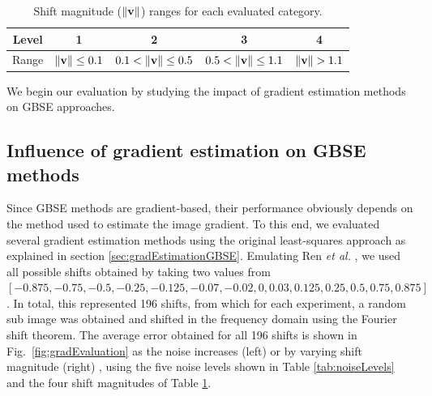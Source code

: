 \begin{table}[htpb]
\centering
\begin{tabular}{|c|c|c|c|c|} 
	\hline
	Level & 1 & 2 & 3 & 4 \\ \hline
	Range & $\left\lVert\mathbf{v}\right\rVert \leq 0.1$ & $0.1 < \left\lVert\mathbf{v}\right\rVert \leq 0.5$ & $0.5 < \left\lVert\mathbf{v}\right\rVert \leq 1.1$ & $\left\lVert\mathbf{v}\right\rVert > 1.1$ \\ \hline
\end{tabular}
\caption{Shift magnitude ($\left\lVert\mathbf{v}\right\rVert$) ranges for each evaluated category.}
\label{tab:shiftMagnitudeCategories}
\end{table}


We begin our evaluation by studying the impact of gradient estimation methods on GBSE approaches.

\subsection{Influence of gradient estimation on GBSE methods}
Since GBSE methods are gradient-based, their performance obviously depends on the method used to estimate the image gradient. To this end, we evaluated several gradient estimation methods using the original least-squares approach as explained in section \ref{sec:gradEstimationGBSE}.  Emulating Ren \emph{et al.} \cite{Ren_2010}, we used all possible shifts obtained by taking two values from $[-0.875, -0.75, -0.5, -0.25, -0.125, -0.07, -0.02, 0, 0.03, 0.125, 0.25, 0.5, 0.75, 0.875]$. In total, this represented 196 shifts, from which for each experiment, a random sub	image was obtained and shifted in the frequency domain using the Fourier shift theorem. The average error obtained for all 196 shifts is shown in Fig.~\ref{fig:gradEvaluation} as the noise increases (left) or by varying shift magnitude (right) , using the five noise levels shown in Table \ref{tab:noiseLevels} and the four shift magnitudes of Table \ref{tab:shiftMagnitudeCategories}. 

